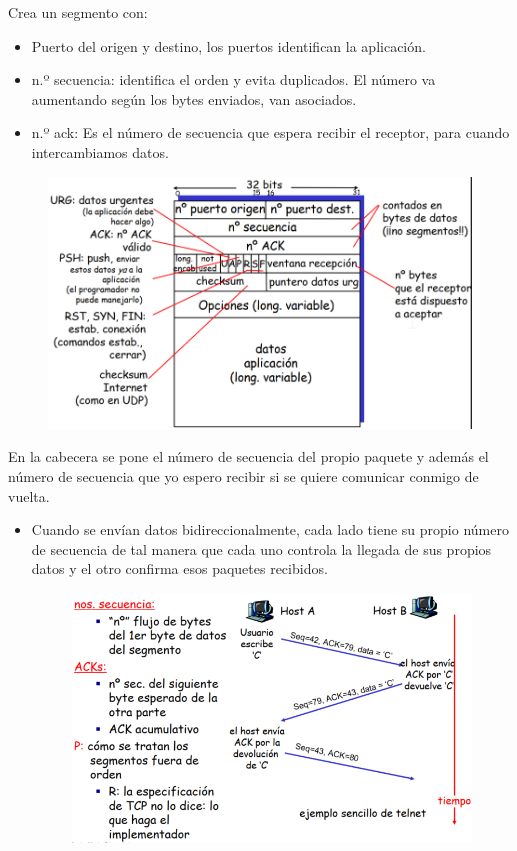 \documentclass[12pt, twoside, openright]{report} %
\begin{document}
Crea un segmento con:

\begin{itemize}
	\item Puerto del origen y destino, los puertos identifican la
	      aplicación.
	\item n.º secuencia: identifica el orden y evita duplicados. El número va
	      aumentando según los bytes enviados, van asociados.
	\item n.º ack: Es el número de secuencia que espera recibir el receptor,
	      para cuando intercambiamos datos.
\end{itemize}
\begin{figure}[H]
	{\includegraphics[scale=.4]{Untitled 4.png}}
\end{figure}
\pagebreak
En la cabecera se pone el número de secuencia del propio paquete y
además el número de secuencia que yo espero recibir si se quiere
comunicar conmigo de vuelta.

\begin{itemize}
	\item Cuando se envían datos bidireccionalmente, cada lado tiene su
	      propio número de secuencia de tal manera que cada uno controla la
	      llegada de sus propios datos y el otro confirma esos paquetes
	      recibidos.
	      \begin{figure}[H]
		      {\includegraphics[scale=.45]{Untitled 5.png}}
	      \end{figure}
\end{itemize}
\end{document}
